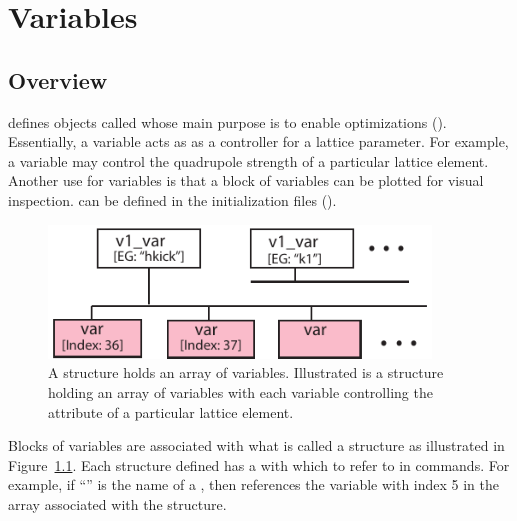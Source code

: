 \chapter{Variables}
\label{c:var}

\section{Overview}
\label{s:var.overview}

\tao defines objects called  whose main purpose is to enable optimizations
(). Essentially, a variable acts as as a controller for a lattice parameter. For
example, a variable may control the  quadrupole strength of a particular lattice element.
Another use for variables is that a block of variables can be plotted for visual inspection.
 can be defined in the \tao initialization files ().

\begin{figure}
  \centering
  \includegraphics[width=4in]{var-tree.pdf}
  \caption[VAriable tree structure]
{A  structure holds an array of variables. Illustrated is a  structure
holding an array of variables with each variable controlling the  attribute of a
particular lattice element.}
  \label{f:var.tree}
\end{figure}


Blocks of variables are associated with what is called a  structure as illustrated in
Figure~\ref{f:var.tree}. Each  structure defined has a  with which to refer to
in \tao commands. For example, if ``'' is the name of a , then
 references the variable with index 5 in the array associated with the 
 structure.

